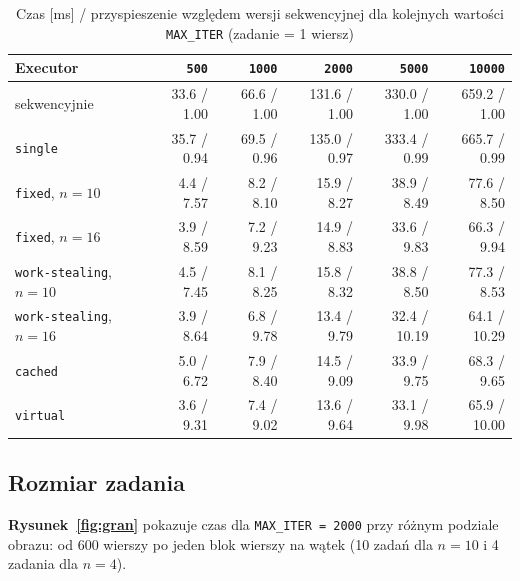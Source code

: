 \documentclass[11pt,a4paper]{article}
\begin{document}
\begin{table}[H]
    \centering
    \renewcommand{\arraystretch}{1.3}
    \begin{tabular}{|l|r|r|r|r|r|}
        \hline
        Executor & \texttt{500} & \texttt{1000} & \texttt{2000} & \texttt{5000} & \texttt{10000} \\ \hline
        sekwencyjnie & \num{33.6} / \num{1.00} & \num{66.6} / \num{1.00} & \num{131.6} / \num{1.00} & \num{330.0} / \num{1.00} & \num{659.2} / \num{1.00} \\
        \texttt{single} & \num{35.7} / \num{0.94} & \num{69.5} / \num{0.96} & \num{135.0} / \num{0.97} & \num{333.4} / \num{0.99} & \num{665.7} / \num{0.99} \\
        \texttt{fixed}, $n = 10$ & \num{4.4} / \num{7.57} & \num{8.2} / \num{8.10} & \num{15.9} / \num{8.27} & \num{38.9} / \num{8.49} & \num{77.6} / \num{8.50} \\
        \texttt{fixed}, $n = 16$ & \num{3.9} / \num{8.59} & \num{7.2} / \num{9.23} & \num{14.9} / \num{8.83} & \num{33.6} / \num{9.83} & \num{66.3} / \num{9.94} \\
        \texttt{work-stealing}, $n = 10$ & \num{4.5} / \num{7.45} & \num{8.1} / \num{8.25} & \num{15.8} / \num{8.32} & \num{38.8} / \num{8.50} & \num{77.3} / \num{8.53} \\
        \texttt{work-stealing}, $n = 16$ & \num{3.9} / \num{8.64} & \num{6.8} / \num{9.78} & \num{13.4} / \num{9.79} & \num{32.4} / \num{10.19} & \num{64.1} / \num{10.29} \\
        \texttt{cached} & \num{5.0} / \num{6.72} & \num{7.9} / \num{8.40} & \num{14.5} / \num{9.09} & \num{33.9} / \num{9.75} & \num{68.3} / \num{9.65} \\
        \texttt{virtual} & \num{3.6} / \num{9.31} & \num{7.4} / \num{9.02} & \num{13.6} / \num{9.64} & \num{33.1} / \num{9.98} & \num{65.9} / \num{10.00} \\
        \hline
    \end{tabular}
    \caption{Czas [ms] / przyspieszenie względem wersji sekwencyjnej dla kolejnych wartości \texttt{MAX\_ITER} (zadanie = 1 wiersz)}
    \label{tab:summary}
\end{table}

\subsection{Rozmiar zadania}
\textbf{Rysunek~\ref{fig:gran}} pokazuje czas dla \texttt{MAX\_ITER = 2000} przy różnym podziale obrazu:
od 600 wierszy po jeden blok wierszy na wątek (10 zadań dla $n = 10$ i 4 zadania dla $n = 4$).
\end{document}
